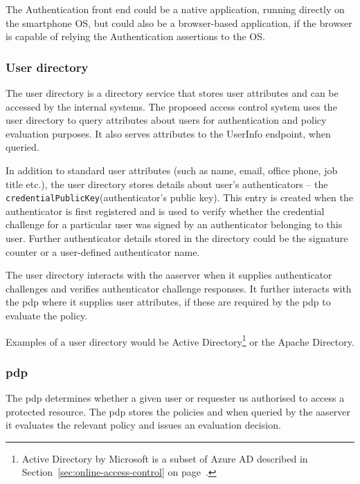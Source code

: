 The Authentication front end could be a native application, running directly on the smartphone OS, but could also be a browser-based application, if the browser is capable of relying the Authentication assertions to the OS\footnotemark.
% 

\subsubsection{User directory}
The user directory is a directory service that stores user attributes and can be accessed by the internal systems. The proposed access control system uses the user directory to query attributes about users for authentication and policy evaluation purposes. It also serves attributes to the UserInfo endpoint, when queried.

In addition to standard user attributes (such as name, email, office phone, job title etc.), the user directory stores details about user's authenticators -- the \texttt{credentialPublicKey}\footnotemark (authenticator's public key). This entry is created when the authenticator is first registered and is used to verify whether the credential challenge for a particular user was signed by an authenticator belonging to this user. Further authenticator details stored in the directory could be the signature counter or a user-defined authenticator name.
% 

The user directory interacts with the \acrshort{aaserver} when it supplies authenticator challenges and verifies authenticator challenge responses. It further interacts with the \acrshort{pdp} where it supplies user attributes, if these are required by the \acrshort{pdp} to evaluate the policy.

Examples of a user directory would be Active Directory\footnote{Active Directory by Microsoft is a subset of Azure AD described in Section~\ref{sec:online-access-control} on page~\pageref{sec:online-access-control}.} or the Apache Directory\footnotemark.
% 
    
\subsubsection{\acrlong{pdp}}
The \acrfull{pdp} determines whether a given user or requester us authorised to access a protected resource. The \acrshort{pdp} stores the policies and when queried by the \acrshort{aaserver} it evaluates the relevant policy and issues an evaluation decision.

